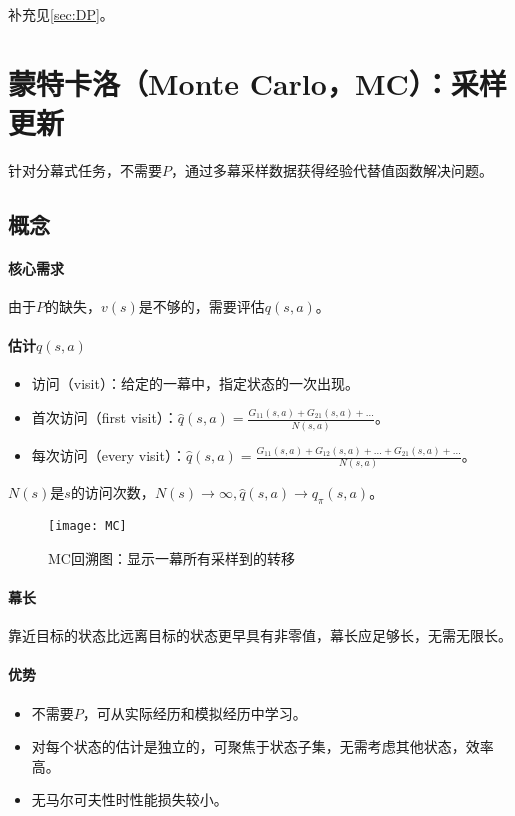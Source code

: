 \documentclass[
12pt, %
a4paper, 
oneside, %
headinclude,footinclude, %
]{scrartcl}
\begin{document}
补充见\ref{sec:DP}。
\section[蒙特卡洛]{蒙特卡洛（Monte Carlo，MC）：采样更新}
针对分幕式任务，不需要$ P $，通过多幕采样数据获得经验代替值函数解决问题。
\subsection[概念]{概念}
\paragraph{核心需求}
由于$ P $的缺失，$ v(s) $是不够的，需要评估$ q(s, a) $。
\paragraph{估计$ q(s, a) $}
\begin{itemize}
\item 访问（visit）：给定的一幕中，指定状态的一次出现。
\item 首次访问（first visit）：$ \hat{q}(s, a) = \frac{G_{11}(s, a) + G_{21}(s, a) + \dots}{N(s, a)} $。
\item 每次访问（every visit）：$ \hat{q}(s, a) = \frac{G_{11}(s, a) + G_{12}(s, a) + \dots + G_{21}(s, a) + \dots}{N(s, a)} $。
\end{itemize}

$ N(s) $是$ s $的访问次数，$ N(s) \to \infty, \hat{q}(s, a) \to q_{\pi}(s, a) $。

\begin{figure}[H]
\centering 
\texttt{[image: MC]} 
\caption{MC回溯图：显示一幕所有采样到的转移}
\end{figure}
\paragraph{幕长}
靠近目标的状态比远离目标的状态更早具有非零值，幕长应足够长，无需无限长。
\paragraph{优势}
\begin{itemize}
\item 不需要$ P $，可从实际经历和模拟经历中学习。
\item 对每个状态的估计是独立的，可聚焦于状态子集，无需考虑其他状态，效率高。
\item 无马尔可夫性时性能损失较小。
\end{itemize}
\end{document}
